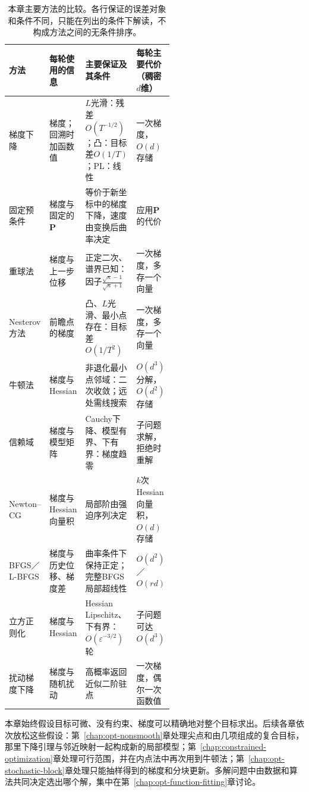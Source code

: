 \begin{table}[htbp]
  \centering
  \small
  \begin{tabularx}{\linewidth}{@{}>{\raggedright\arraybackslash}p{0.15\linewidth}>{\raggedright\arraybackslash}p{0.2\linewidth}>{\raggedright\arraybackslash}X>{\raggedright\arraybackslash}p{0.2\linewidth}@{}}
    \toprule
    方法 & 每轮使用的信息 & 主要保证及其条件 & 每轮主要代价（稠密$d$维） \\
    \midrule
    梯度下降 & 梯度；回溯时加函数值 & $L$光滑：残差$O(T^{-1/2})$；凸：目标差$O(1/T)$；PL：线性 & 一次梯度，$O(d)$存储 \\
    固定预条件 & 梯度与固定的$\bm P$ & 等价于新坐标中的梯度下降，速度由变换后曲率决定 & 应用$\bm P$的代价 \\
    重球法 & 梯度与上一步位移 & 正定二次、谱界已知：因子$\tfrac{\sqrt\kappa-1}{\sqrt\kappa+1}$ & 一次梯度，多存一个向量 \\
    Nesterov方法 & 前瞻点的梯度 & 凸、$L$光滑、最小点存在：目标差$O(1/T^2)$ & 一次梯度，多存一个向量 \\
    牛顿法 & 梯度与Hessian & 非退化最小点邻域：二次收敛；远处需线搜索 & $O(d^3)$分解，$O(d^2)$存储 \\
    信赖域 & 梯度与模型矩阵 & Cauchy下降、模型有界、下有界：梯度趋零 & 子问题求解，拒绝时重解 \\
    Newton--CG & 梯度与Hessian向量积 & 局部阶由强迫序列决定 & $k$次Hessian向量积，$O(d)$存储 \\
    BFGS／L-BFGS & 梯度与历史位移、梯度差 & 曲率条件下保持正定；完整BFGS局部超线性 & $O(d^2)$／$O(rd)$ \\
    立方正则化 & 梯度与Hessian & Hessian Lipschitz、下有界：$O(\varepsilon^{-3/2})$轮 & 子问题可达$O(d^3)$ \\
    扰动梯度下降 & 梯度与随机扰动 & 高概率返回近似二阶驻点 & 一次梯度，偶尔一次函数值 \\
    \bottomrule
  \end{tabularx}
  \caption{本章主要方法的比较。各行保证的误差对象和条件不同，只能在列出的条件下解读，不构成方法之间的无条件排序。}
  \label{tab:opt-smooth-summary}
\end{table}

本章始终假设目标可微、没有约束、梯度可以精确地对整个目标求出。后续各章依次放松这些假设：第~\ref{chap:opt-nonsmooth}章处理尖点和由几项组成的复合目标，那里下降引理与邻近映射一起构成新的局部模型；第~\ref{chap:constrained-optimization}章处理可行范围，并在内点法中再次用到牛顿法；第~\ref{chap:opt-stochastic-block}章处理只能抽样得到的梯度和分块更新。多解问题中由数据和算法共同决定选出哪个解，集中在第~\ref{chap:opt-function-fitting}章讨论。
